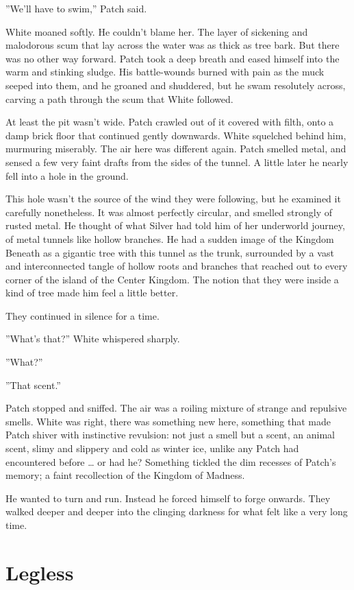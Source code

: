 \documentclass[12pt]{book}
\begin{document}
''We'll have to swim,'' Patch said.

White moaned softly. He couldn't blame her. The layer of sickening and
malodorous scum that lay across the water was as thick as tree
bark. But there was no other way forward. Patch took a deep breath and
eased himself into the warm and stinking sludge. His battle-wounds
burned with pain as the muck seeped into them, and he groaned and
shuddered, but he swam resolutely across, carving a path through the
scum that White followed.

At least the pit wasn't wide. Patch crawled out of it covered with
filth, onto a damp brick floor that continued gently downwards. White
squelched behind him, murmuring miserably. The air here was different
again. Patch smelled metal, and sensed a few very faint drafts from
the sides of the tunnel. A little later he nearly fell into a hole in
the ground.

This hole wasn't the source of the wind they were following, but he
examined it carefully nonetheless. It was almost perfectly circular,
and smelled strongly of rusted metal. He thought of what Silver had
told him of her underworld journey, of metal tunnels like hollow
branches. He had a sudden image of the Kingdom Beneath as a gigantic
tree with this tunnel as the trunk, surrounded by a vast and
interconnected tangle of hollow roots and branches that reached out to
every corner of the island of the Center Kingdom. The notion that they
were inside a kind of tree made him feel a little better.

They continued in silence for a time.

''What's that?'' White whispered sharply.

''What?''

''That scent.''

Patch stopped and sniffed. The air was a roiling mixture of strange
and repulsive smells. White was right, there was something new here,
something that made Patch shiver with instinctive revulsion: not just
a smell but a scent, an animal scent, slimy and slippery and cold as
winter ice, unlike any Patch had encountered before \ldots{} or had
he?  Something tickled the dim recesses of Patch's memory; a faint
recollection of the Kingdom of Madness.

He wanted to turn and run. Instead he forced himself to forge
onwards. They walked deeper and deeper into the clinging darkness for
what felt like a very long time.


\section{Legless}
\end{document}
